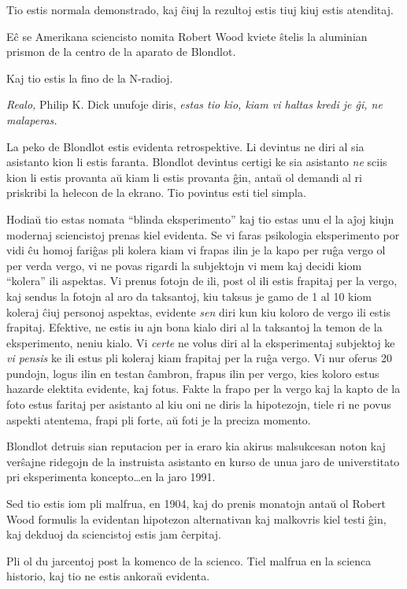Tio estis normala demonstrado, kaj ĉiuj la rezultoj estis tiuj kiuj
estis atenditaj.

Eĉ se Amerikana sciencisto nomita Robert Wood kviete ŝtelis la
aluminian prismon de la centro de la aparato de Blondlot.

Kaj tio estis la fino de la N-radioj.

\emph{Realo,} Philip K. Dick unufoje diris, \emph{estas tio kio, kiam vi haltas kredi je ĝi, ne malaperas.}

La peko de Blondlot estis evidenta retrospektive. Li devintus ne diri
al sia asistanto kion li estis faranta. Blondlot devintus certigi ke
sia asistanto \emph{ne} sciis kion li estis provanta aŭ kiam li estis
provanta ĝin, antaŭ ol demandi al ri priskribi la helecon de la
ekrano. Tio povintus esti tiel simpla.

Hodiaŭ tio estas nomata ``blinda eksperimento'' kaj tio estas unu el
la aĵoj kiujn modernaj sciencistoj prenas kiel evidenta. Se vi faras
psikologia eksperimento por vidi ĉu homoj fariĝas pli kolera kiam vi
frapas ilin je la kapo per ruĝa vergo ol per verda vergo, vi ne povas
rigardi la subjektojn vi mem kaj decidi kiom ``kolera'' ili
aspektas. Vi prenus fotojn de ili, post ol ili estis frapitaj per la
vergo, kaj sendus la fotojn al aro da taksantoj, kiu taksus je gamo de
1 al 10 kiom koleraj ĉiuj personoj aspektas, evidente \emph{sen} diri
kun kiu koloro de vergo ili estis frapitaj. Efektive, ne estis iu ajn
bona kialo diri al la taksantoj la temon de la eksperimento, neniu
kialo. Vi \emph{certe} ne volus diri al la eksperimentaj subjektoj ke
\emph{vi pensis} ke ili estus pli koleraj kiam frapitaj per la ruĝa
vergo. Vi nur oferus 20 pundojn, logus ilin en testan ĉambron, frapus
ilin per vergo, kies koloro estus hazarde elektita evidente, kaj
fotus. Fakte la frapo per la vergo kaj la kapto de la foto estus
faritaj per asistanto al kiu oni ne diris la hipotezojn, tiele ri ne
povus aspekti atentema, frapi pli forte, aŭ foti je la preciza
momento.

Blondlot detruis sian reputacion per ia eraro kia akirus malsukcesan
noton kaj verŝajne ridegojn de la instruista asistanto en kurso de
unua jaro de universtitato pri eksperimenta koncepto\ldots en la jaro
1991.

Sed tio estis iom pli malfrua, en 1904, kaj do prenis monatojn antaŭ
ol Robert Wood formulis la evidentan hipotezon alternativan kaj
malkovris kiel testi ĝin, kaj dekduoj da sciencistoj estis jam
ĉerpitaj.

Pli ol du jarcentoj post la komenco de la scienco. Tiel malfrua en la
scienca historio, kaj tio ne estis ankoraŭ evidenta.

